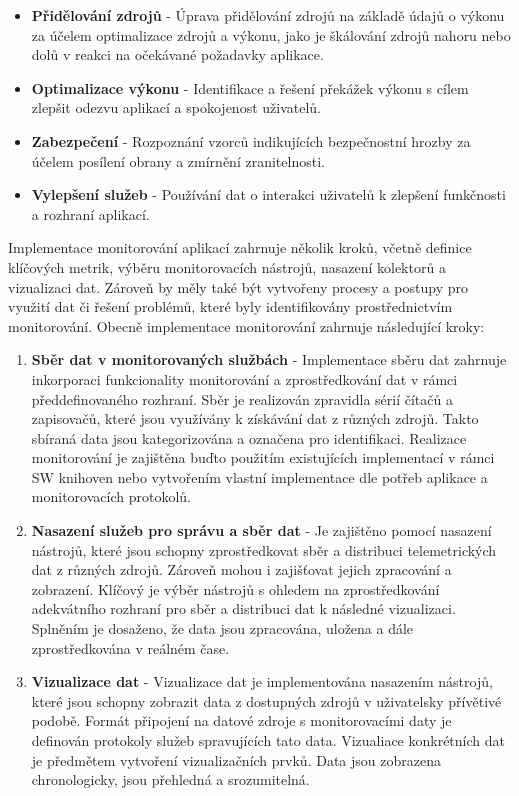 \begin{itemize}
    \item \textbf{Přidělování zdrojů} - Úprava přidělování zdrojů na základě údajů o výkonu za účelem optimalizace zdrojů a výkonu, jako je škálování zdrojů nahoru nebo dolů v reakci na očekávané požadavky aplikace.
    \item \textbf{Optimalizace výkonu} - Identifikace a řešení překážek výkonu s cílem zlepšit odezvu aplikací a spokojenost uživatelů.
    \item \textbf{Zabezpečení} - Rozpoznání vzorců indikujících bezpečnostní hrozby za účelem posílení obrany a zmírnění zranitelnosti.
    \item \textbf{Vylepšení služeb} - Používání dat o interakci uživatelů k zlepšení funkčnosti a rozhraní aplikací.
\end{itemize}


Implementace monitorování aplikací zahrnuje několik kroků, včetně definice klíčových metrik, výběru monitorovacích nástrojů, nasazení kolektorů a vizualizaci dat. Zároveň by měly také být vytvořeny procesy a postupy pro využití dat či řešení problémů, které byly identifikovány prostřednictvím monitorování. \cite{Blanco2023} Obecně implementace monitorování zahrnuje následující kroky:

\begin{enumerate}
    \item \textbf{Sběr dat v monitorovaných službách} - Implementace sběru dat zahrnuje inkorporaci funkcionality monitorování a zprostředkování dat v rámci předdefinovaného rozhraní. Sběr je realizován zpravidla sérií čítačů a zapisovačů, které jsou využívány k získávání dat z různých zdrojů. Takto sbíraná data jsou kategorizována a označena pro identifikaci. Realizace monitorování je zajištěna buďto použitím existujících implementací v rámci SW knihoven nebo vytvořením vlastní implementace dle potřeb aplikace a monitorovacích protokolů.
    \item \textbf{Nasazení služeb pro správu a sběr dat} - Je zajištěno pomocí nasazení nástrojů, které jsou schopny zprostředkovat sběr a distribuci telemetrických dat z různých zdrojů. Zároveň mohou i zajišťovat jejich zpracování a zobrazení. Klíčový je výběr nástrojů s ohledem na zprostředkování adekvátního rozhraní pro sběr a distribuci dat k následné vizualizaci. Splněním je dosaženo, že data jsou zpracována, uložena a dále zprostředkována v reálném čase.
    \item \textbf{Vizualizace dat} - Vizualizace dat je implementována nasazením nástrojů, které jsou schopny zobrazit data z dostupných zdrojů v uživatelsky přívětivé podobě. Formát připojení na datové zdroje s monitorovacími daty je definován protokoly služeb spravujících tato data. Vizualiace konkrétních dat je předmětem vytvoření vizualizačních prvků. Data jsou zobrazena chronologicky, jsou přehledná a srozumitelná.
\end{enumerate}

